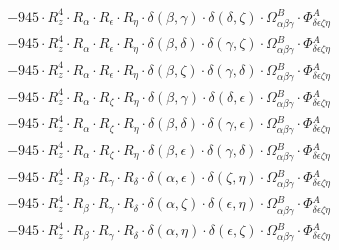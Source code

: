 \documentclass{article}
\begin{document}
\begin{equation}
\begin{array}{c}
 \\[0.2em] 		 - 945 \cdot R_{z}^{4} \cdot R_{\alpha{}} \cdot R_{\epsilon{}} \cdot R_{\eta{}} \cdot \delta{}\left(\beta{}, \gamma{}\right) \cdot \delta{}\left(\delta{}, \zeta{}\right) \cdot \Omega{}^{B}_{\alpha{}\beta{}\gamma{}} \cdot \Phi{}^{A}_{\delta{}\epsilon{}\zeta{}\eta{}} 
 \\[0.2em] 		 - 945 \cdot R_{z}^{4} \cdot R_{\alpha{}} \cdot R_{\epsilon{}} \cdot R_{\eta{}} \cdot \delta{}\left(\beta{}, \delta{}\right) \cdot \delta{}\left(\gamma{}, \zeta{}\right) \cdot \Omega{}^{B}_{\alpha{}\beta{}\gamma{}} \cdot \Phi{}^{A}_{\delta{}\epsilon{}\zeta{}\eta{}} 
 \\[0.2em] 		 - 945 \cdot R_{z}^{4} \cdot R_{\alpha{}} \cdot R_{\epsilon{}} \cdot R_{\eta{}} \cdot \delta{}\left(\beta{}, \zeta{}\right) \cdot \delta{}\left(\gamma{}, \delta{}\right) \cdot \Omega{}^{B}_{\alpha{}\beta{}\gamma{}} \cdot \Phi{}^{A}_{\delta{}\epsilon{}\zeta{}\eta{}} 
 \\[0.2em] 		 - 945 \cdot R_{z}^{4} \cdot R_{\alpha{}} \cdot R_{\zeta{}} \cdot R_{\eta{}} \cdot \delta{}\left(\beta{}, \gamma{}\right) \cdot \delta{}\left(\delta{}, \epsilon{}\right) \cdot \Omega{}^{B}_{\alpha{}\beta{}\gamma{}} \cdot \Phi{}^{A}_{\delta{}\epsilon{}\zeta{}\eta{}} 
 \\[0.2em] 		 - 945 \cdot R_{z}^{4} \cdot R_{\alpha{}} \cdot R_{\zeta{}} \cdot R_{\eta{}} \cdot \delta{}\left(\beta{}, \delta{}\right) \cdot \delta{}\left(\gamma{}, \epsilon{}\right) \cdot \Omega{}^{B}_{\alpha{}\beta{}\gamma{}} \cdot \Phi{}^{A}_{\delta{}\epsilon{}\zeta{}\eta{}} 
 \\[0.2em] 		 - 945 \cdot R_{z}^{4} \cdot R_{\alpha{}} \cdot R_{\zeta{}} \cdot R_{\eta{}} \cdot \delta{}\left(\beta{}, \epsilon{}\right) \cdot \delta{}\left(\gamma{}, \delta{}\right) \cdot \Omega{}^{B}_{\alpha{}\beta{}\gamma{}} \cdot \Phi{}^{A}_{\delta{}\epsilon{}\zeta{}\eta{}} 
 \\[0.2em] 		 - 945 \cdot R_{z}^{4} \cdot R_{\beta{}} \cdot R_{\gamma{}} \cdot R_{\delta{}} \cdot \delta{}\left(\alpha{}, \epsilon{}\right) \cdot \delta{}\left(\zeta{}, \eta{}\right) \cdot \Omega{}^{B}_{\alpha{}\beta{}\gamma{}} \cdot \Phi{}^{A}_{\delta{}\epsilon{}\zeta{}\eta{}} 
 \\[0.2em] 		 - 945 \cdot R_{z}^{4} \cdot R_{\beta{}} \cdot R_{\gamma{}} \cdot R_{\delta{}} \cdot \delta{}\left(\alpha{}, \zeta{}\right) \cdot \delta{}\left(\epsilon{}, \eta{}\right) \cdot \Omega{}^{B}_{\alpha{}\beta{}\gamma{}} \cdot \Phi{}^{A}_{\delta{}\epsilon{}\zeta{}\eta{}} 
 \\[0.2em] 		 - 945 \cdot R_{z}^{4} \cdot R_{\beta{}} \cdot R_{\gamma{}} \cdot R_{\delta{}} \cdot \delta{}\left(\alpha{}, \eta{}\right) \cdot \delta{}\left(\epsilon{}, \zeta{}\right) \cdot \Omega{}^{B}_{\alpha{}\beta{}\gamma{}} \cdot \Phi{}^{A}_{\delta{}\epsilon{}\zeta{}\eta{}} 

\end{array}
\end{equation}
\end{document}
